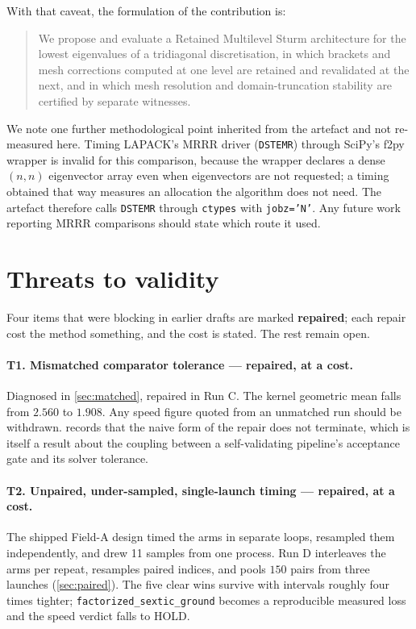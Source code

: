 \documentclass[twocolumn,10pt,a4paper]{article}
\theoremstyle{plain}
\theoremstyle{definition}
\newcommand{\HOLD}{\textsf{HOLD}}
\begin{document}
With that caveat, the formulation of the contribution is:

\begin{quote}
We propose and evaluate a Retained Multilevel Sturm architecture for the lowest
eigenvalues of a tridiagonal discretisation, in which brackets and mesh
corrections computed at one level are retained and revalidated at the next, and
in which mesh resolution and domain-truncation stability are certified by
separate witnesses.
\end{quote}

We note one further methodological point inherited from the artefact and not
re-measured here. Timing LAPACK's MRRR driver (\texttt{DSTEMR}) through SciPy's
f2py wrapper is invalid for this comparison, because the wrapper declares a
dense $(n,n)$ eigenvector array even when eigenvectors are not requested; a
timing obtained that way measures an allocation the algorithm does not need. The
artefact therefore calls \texttt{DSTEMR} through \texttt{ctypes} with
\texttt{jobz='N'}. Any future work reporting MRRR comparisons should state which
route it used.

\section{Threats to validity}
\label{sec:threats}

Four items that were blocking in earlier drafts are marked \textbf{repaired};
each repair cost the method something, and the cost is stated. The rest remain
open.

\paragraph{T1. Mismatched comparator tolerance --- \textbf{repaired}, at a cost.}
Diagnosed in \cref{sec:matched}, repaired in Run C. The kernel geometric mean
falls from $2.560$ to $1.908$. Any speed figure quoted from an unmatched run
should be withdrawn.  records that the naive form of the repair
does not terminate, which is itself a result about the coupling between a
self-validating pipeline's acceptance gate and its solver tolerance.

\paragraph{T2. Unpaired, under-sampled, single-launch timing ---
\textbf{repaired}, at a cost.} The shipped Field-A design timed the arms in
separate loops, resampled them independently, and drew 11 samples from one
process. Run D interleaves the arms per repeat, resamples paired indices, and
pools $150$ pairs from three launches (\cref{sec:paired}). The five clear wins
survive with intervals roughly four times tighter;
\texttt{factorized\_sextic\_ground} becomes a reproducible measured loss and the
speed verdict falls to \HOLD{}.
\end{document}
